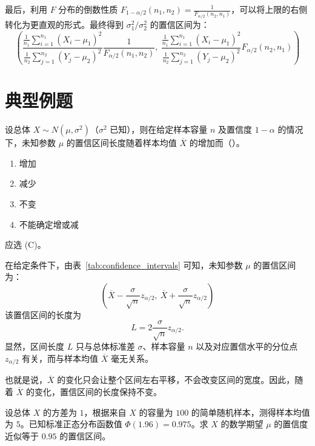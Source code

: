 ﻿\documentclass[lang=cn,11pt]{elegantbook}
\begin{document}
\begin{solution}
最后，利用 $F$ 分布的倒数性质 $F_{1-\alpha/2}(n_1, n_2) = \frac{1}{F_{\alpha/2}(n_2, n_1)}$，可以将上限的右侧转化为更直观的形式。最终得到 $\sigma_1^2/\sigma_2^2$ 的置信区间为：
\begin{equation*}
\left(\frac{\frac{1}{n_1}\sum_{i=1}^{n_1}(X_i-\mu_1)^2}{\frac{1}{n_2}\sum_{j=1}^{n_2}(Y_j-\mu_2)^2}\frac{1}{F_{\alpha/2}(n_1,n_2)},\ \frac{\frac{1}{n_1}\sum_{i=1}^{n_1}(X_i-\mu_1)^2}{\frac{1}{n_2}\sum_{j=1}^{n_2}(Y_j-\mu_2)^2} F_{\alpha/2}(n_2,n_1)\right)
\end{equation*}
\end{solution}


\section{典型例题}

\begin{exercise} \label{ex:ci_length}
设总体 $X \sim N(\mu,\sigma^2)$（$\sigma^2$ 已知），则在给定样本容量 $n$ 及置信度 $1-\alpha$ 的情况下，未知参数 $\mu$ 的置信区间长度随着样本均值 $\overline{X}$ 的增加而（\qquad）。
\begin{enumerate}
  \item[(A)] 增加
  \item[(B)] 减少
  \item[(C)] 不变
  \item[(D)] 不能确定增或减
\end{enumerate}
\end{exercise}

\begin{solution}
应选 (C)。

在给定条件下，由表~\ref{tab:confidence_intervals} 可知，未知参数 $\mu$ 的置信区间为：
\begin{equation*}
\left( \overline{X} - \frac{\sigma}{\sqrt{n}} z_{\alpha/2},\ \overline{X} + \frac{\sigma}{\sqrt{n}} z_{\alpha/2} \right)
\end{equation*}
该置信区间的长度为
\[
L = 2\frac{\sigma}{\sqrt{n}} z_{\alpha/2}.
\]
显然，区间长度 \(L\) 只与总体标准差 \(\sigma\)、样本容量 \(n\) 以及对应置信水平的分位点 \(z_{\alpha/2}\) 有关，而与样本均值 \(\overline{X}\) 毫无关系。

也就是说，\(\overline{X}\) 的变化只会让整个区间左右平移，不会改变区间的宽度。因此，随着 \(\overline{X}\) 的变化，置信区间的长度保持不变。
\end{solution}

\begin{exercise} \label{ex:ci_large_sample}
设总体 $X$ 的方差为 $1$，根据来自 $X$ 的容量为 $100$ 的简单随机样本，测得样本均值为 $5$。已知标准正态分布函数值 $\Phi(1.96)=0.975$。求 $X$ 的数学期望 $\mu$ 的置信度近似等于 $0.95$ 的置信区间。
\end{exercise}
\end{document}
